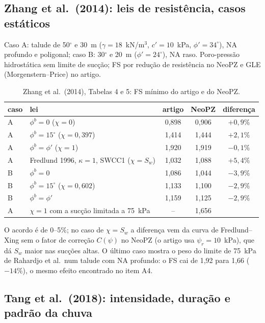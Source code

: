 \subsection{Zhang et al.\ (2014): leis de resist\^encia, casos est\'aticos}

Caso A: talude de 50$^\circ$ e 30~m ($\gamma=18$~kN/m$^3$, $c'=10$~kPa, $\phi'=34^\circ$), NA profundo e poligonal;
caso B: 30$^\circ$ e 20~m ($\phi'=24^\circ$), NA raso. Poro-press\~ao hidrost\'atica sem limite de suc\c{c}\~ao; FS por
redu\c{c}\~ao de resist\^encia no NeoPZ e GLE (Morgenstern--Price) no artigo.

\begin{table}[h!]
\centering\small
\caption{Zhang et al.\ (2014), Tabelas 4 e 5: FS m\'inimo do artigo e do NeoPZ.}\label{tab:zhang}
\begin{tabular}{llccc}
\toprule
caso & lei & artigo & NeoPZ & diferen\c{c}a\\
\midrule
A & $\phi^b=0$ ($\chi=0$) & 0,898 & 0,906 & $+0{,}9\%$\\
A & $\phi^b=15^\circ$ ($\chi=0{,}397$) & 1,414 & 1,444 & $+2{,}1\%$\\
A & $\phi^b=\phi'$ ($\chi=1$) & 1,920 & 1,919 & $-0{,}1\%$\\
A & Fredlund 1996, $\kappa=1$, SWCC1 ($\chi=S_w$) & 1,032 & 1,088 & $+5{,}4\%$\\
B & $\phi^b=0$ & 1,086 & 1,044 & $-3{,}9\%$\\
B & $\phi^b=15^\circ$ ($\chi=0{,}602$) & 1,133 & 1,100 & $-2{,}9\%$\\
B & $\phi^b=\phi'$ & 1,159 & 1,125 & $-2{,}9\%$\\
\midrule
A & $\chi=1$ com a suc\c{c}\~ao limitada a 75~kPa & -- & 1,656 & \\
\bottomrule
\end{tabular}
\end{table}

O acordo \'e de 0--5\%; no caso de $\chi=S_w$ a diferen\c{c}a vem da curva de Fredlund--Xing sem o fator de corre\c{c}\~ao
$C(\psi)$ no NeoPZ (o artigo usa $\psi_r=10$~kPa), que d\'a $S_w$ maior nas suc\c{c}\~oes altas. O \'ultimo caso
mostra o peso do limite de 75~kPa de Rahardjo et al.\ num talude com NA profundo: o FS cai de 1,92 para 1,66
($-14\%$), o mesmo efeito encontrado no item A4.

\subsection{Tang et al.\ (2018): intensidade, dura\c{c}\~ao e padr\~ao da chuva}

